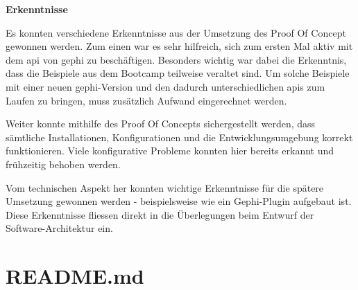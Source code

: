 \textbf{Erkenntnisse}

Es konnten verschiedene Erkenntnisse aus der Umsetzung des Proof Of Concept gewonnen werden.
Zum einen war es sehr hilfreich, sich zum ersten Mal aktiv mit dem \acs{api} von \acs{gephi} zu beschäftigen. Besonders wichtig war
dabei die Erkenntnis, dass die Beispiele aus dem Bootcamp teilweise veraltet sind. Um solche Beispiele mit einer neuen \acs{gephi}-Version
und den dadurch unterschiedlichen \acs{api}s zum Laufen zu bringen, muss zusätzlich Aufwand eingerechnet werden.

Weiter konnte mithilfe des Proof Of Concepts sichergestellt werden, dass sämtliche Installationen, Konfigurationen und die
Entwicklungsumgebung korrekt funktionieren. Viele konfigurative Probleme konnten hier bereits erkannt und frühzeitig behoben werden.

Vom technischen Aspekt her konnten wichtige Erkenntnisse für die spätere Umsetzung gewonnen werden - beispielsweise
wie ein Gephi-Plugin aufgebaut ist. Diese Erkenntnisse fliessen direkt in die Überlegungen beim Entwurf der Software-Architektur ein.

\section{README.md}
\label{readme}

